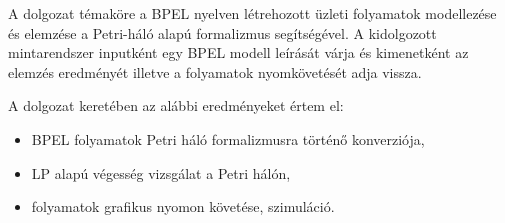 
A dolgozat témaköre a BPEL nyelven létrehozott üzleti folyamatok modellezése  és elemzése a Petri-háló alapú formalizmus segítségével. A kidolgozott mintarendszer inputként egy BPEL modell leírását várja és kimenetként az elemzés eredményét illetve a folyamatok nyomkövetését adja vissza.

A dolgozat keretében az alábbi eredményeket értem el:
\begin{itemize}
\item BPEL folyamatok Petri háló formalizmusra történő konverziója,
\item LP alapú végesség vizsgálat a Petri hálón,
\item folyamatok grafikus nyomon követése, szimuláció.
\end{itemize}


